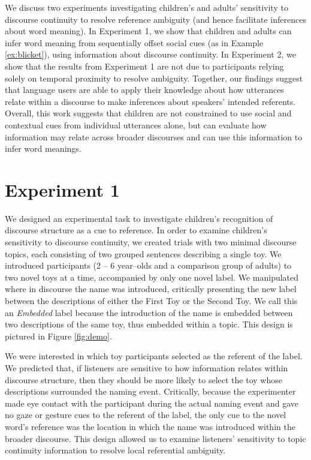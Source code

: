 \documentclass[man]{apa2}
\begin{document}
We discuss two experiments investigating children's and adults' sensitivity to discourse continuity to resolve reference ambiguity (and hence facilitate inferences about word meaning). In Experiment 1, we show that children and adults can infer word meaning from sequentially offset social cues (as in Example \ref{ex:blicket}), using information about discourse continuity.  In Experiment 2, we show that the results from Experiment 1 are not due to participants relying solely on temporal proximity to resolve ambiguity.  Together, our findings suggest that language users are able to apply their knowledge about how utterances relate within a discourse to make inferences about speakers' intended referents.  Overall, this work suggests that children are not constrained to use social and contextual cues from individual utterances alone, but can evaluate how information may relate across broader discourses and can use this information to infer word meanings.

\section{Experiment 1}

We designed an experimental task to investigate children's recognition of discourse structure as a cue to reference. In order to examine children's sensitivity to discourse continuity, we created trials with two minimal discourse topics, each consisting of two grouped sentences describing a single toy.  We introduced participants (2 -- 6 year--olds and a comparison group of adults) to two novel toys at a time, accompanied by only one novel label.  We manipulated where in discourse the name was introduced, critically presenting the new label between the descriptions of either the First Toy or the Second Toy.  We call this an \emph{Embedded} label because the introduction of the name is embedded between two descriptions of the same toy, thus embedded within a topic.  This design is pictured in Figure \ref{fig:demo}.

We were interested in which toy participants selected as the referent of the label.  We predicted that, if listeners are sensitive to how information relates within discourse structure, then they should be more likely to select the toy whose descriptions surrounded the naming event.  Critically, because the experimenter made eye contact with the participant during the actual naming event and gave no gaze or gesture cues to the referent of the label, the only cue to the novel word's reference was the location in which the name was introduced within the broader discourse.  This design allowed us to examine listeners' sensitivity to topic continuity information to resolve local referential ambiguity.  
\end{document}
